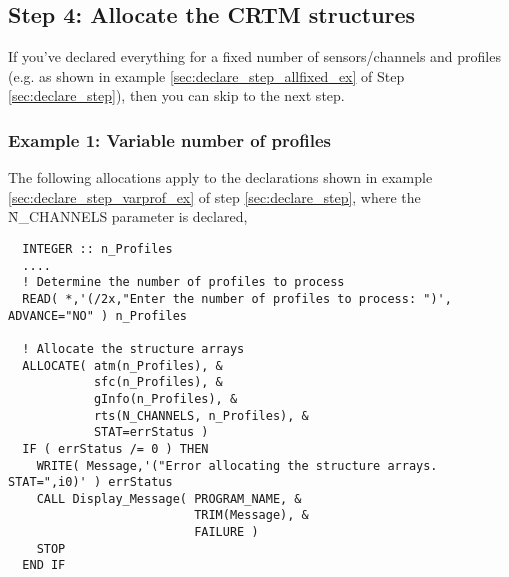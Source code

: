 \subsection{Step 4: Allocate the CRTM structures}
If you've declared everything for a fixed number of sensors/channels and profiles (e.g. as shown in example \ref{sec:declare_step_allfixed_ex} of Step \ref{sec:declare_step}), then you can skip to the next step.

\subsubsection{Example 1: Variable number of profiles}
The following allocations apply to the declarations shown in example \ref{sec:declare_step_varprof_ex} of step \ref{sec:declare_step}, where the \f{N\_CHANNELS} parameter is declared,
\begin{ttfamily}
  \begin{verbatim}
  INTEGER :: n_Profiles
  ....
  ! Determine the number of profiles to process
  READ( *,'(/2x,"Enter the number of profiles to process: ")', ADVANCE="NO" ) n_Profiles
  
  ! Allocate the structure arrays
  ALLOCATE( atm(n_Profiles), &
            sfc(n_Profiles), &
            gInfo(n_Profiles), &
            rts(N_CHANNELS, n_Profiles), &
            STAT=errStatus )
  IF ( errStatus /= 0 ) THEN 
    WRITE( Message,'("Error allocating the structure arrays. STAT=",i0)' ) errStatus
    CALL Display_Message( PROGRAM_NAME, &
                          TRIM(Message), & 
                          FAILURE )
    STOP
  END IF\end{verbatim}
\end{ttfamily}

